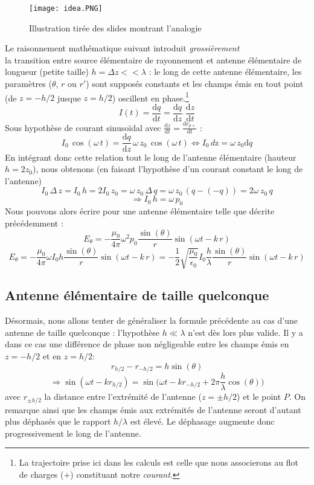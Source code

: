\begin{figure}[h]\centering
\texttt{[image: idea.PNG]}
\caption{Illustration tirée des slides montrant l'analogie}
\label{fig:ae}
\end{figure}

Le raisonnement mathématique suivant introduit \textit{grossièrement} \\la transition entre source élémentaire de rayonnement et antenne élémentaire de longueur (petite taille) $ h = \Delta z << \lambda$ : le long de cette antenne élémentaire, les paramètres ($\theta$, $r$ ou $r'$) sont supposés constants et les champs émis en tout point (de $z=-h/2$ jusque $z=h/2$) oscillent en phase.\footnote{La trajectoire prise ici dans les calculs est celle que nous associerons au flot de charges (+) constituant notre \textit{courant}.} \[ I(t) = \frac{\textrm{d}q}{\textrm{d}t} = \frac{\textrm{d}q}{\textrm{d}z}\,\dot\,\frac{\textrm{d}z}{\textrm{d}t}\] Sous hypothèse de courant sinusoïdal avec $\frac{\textrm{d}z}{\textrm{d}t} = \frac{\textrm{d}r_{p+}}{\textrm{d}t}$ :
\[I_{0}\,\cos(\omega\,t) = \frac{\textrm{d}q}{\textrm{d}z}\,\omega\,z_0\,\cos(\omega\,t) \Leftrightarrow I_0\,d\textrm{z} =\omega \, z_0 \textrm{d}q \]
En intégrant donc cette relation tout le long de l'antenne élémentaire (hauteur $h = 2z_0$), nous obtenons (en faisant l'hypothèse d'un courant constant le long de l'antenne) \[ I_0\,\Delta\,z = I_0 \,h = 2I_0\,z_0 = \omega \,z_0\,\Delta\,q = \omega\, z_0 \, (q-(-q)) = 2\omega\,z_0\,q\]
\[\Rightarrow I_0\,h = \omega\,p_0\]
Nous pouvons alors écrire pour une antenne élémentaire telle que décrite précédemment : 
\[ E_\theta = -\frac{\mu_0}{4\pi}\omega^2p_0\frac{\sin(\theta)}{r}\sin(\omega t-k\,r)\]
\[ E_\theta = -\frac{\mu_0}{4\pi}\omega I_0h\frac{\sin(\theta)}{r}\sin(\omega t-k\,r) =  -\frac{1}{2}\sqrt{\frac{\mu_0}{\epsilon_0}}I_0 \frac{h}{\lambda}\frac{\sin(\theta)}{r}\sin(\omega t-k\, r)\]



\subsection{Antenne élémentaire de taille quelconque}

Désormais, nous allons tenter de généraliser la formule précédente au cas d'une antenne de taille quelconque : l'hypothèse $h\ll \lambda$ n'est dès lors plus valide. Il y a dans ce cas une différence de phase non négligeable entre les champs émis en $z=-h/2$ et en $z=h/2$:
$$ r_{h/2}-r_{-h/2}=h\sin(\theta)$$
$$\Rightarrow \sin(\omega t-kr_{h/2})=\sin\bigg(\omega t-kr_{-h/2}+2\pi\frac{h}{\lambda}\cos(\theta)\bigg)$$
avec $r_{\pm h/2}$ la distance entre l'extrémité de l'antenne ($z=\pm h/2$) et le point $P$. On remarque ainsi que les champs émis aux extrémités de l'antenne seront d'autant plus déphasés que le rapport $h/\lambda$ est élevé. Le déphasage augmente donc progressivement le long de l'antenne.


